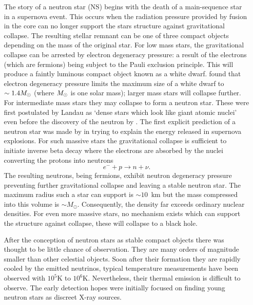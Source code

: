 The story of a neutron star (NS) begins with the death of a main-sequence star
in a supernova event. This occurs when the radiation pressure provided by
fusion in the core can no longer support the stars structure against
gravitational collapse. The resulting stellar remnant can be one of three
compact objects depending on the mass of the original star. For low mass stars,
the gravitational collapse can be arrested by electron degeneracy pressure: a
result of the electrons (which are fermions) being subject to the Pauli
exclusion principle. This will produce a faintly luminous compact object known
as a white dwarf. \citet{Chandrasekhar1931} found that electron degeneracy
pressure limits the maximum size of a white dwarf to~$\sim 1.4 M_{\odot}$ (where
$M_{\odot}$ is one solar mass); larger mass stars will collapse further. For
intermediate mass stars they may collapse to form a neutron star.  These were
first postulated by Landau as `dense stars which look like giant atomic nuclei'
\citep{Yakovlev2013} even before the discovery of the neutron by
\citep{Chadwick1932}.  The first explicit prediction of a neutron star was made
by \citet{Baade1934} in trying to explain the energy released in supernova
explosions. For such massive stars the gravitational collapse is sufficient to
initiate inverse beta decay where the electrons are absorbed by the nuclei
converting the protons into neutrons
\begin{equation}
    e^{-} + p \rightarrow n + \nu.
\end{equation}
The resulting neutrons, being fermions, exhibit neutron degeneracy pressure
preventing further gravitational collapse and leaving a stable neutron star.
The maximum radius such a star can support is $\sim 10$~km but the mass 
compressed into this volume is $\sim M_{\odot}$.  Consequently, the density far
exceeds ordinary nuclear densities. For even more massive stars, no mechanism
exists which can support the structure against collapse, these will collapse to
a black hole. 

After the conception of neutron stars as stable compact objects there was
thought to be little chance of observation. They are many orders of magnitude
smaller than other celestial objects. Soon after their formation they are
rapidly cooled by the emitted neutrinos, typical temperature measurements have
been observed with $10^{5}$K to $10^{6}$K.  Nevertheless, their thermal
emission is difficult to observe. The early detection hopes were initially
focused on finding young neutron stars as discreet X-ray sources.


